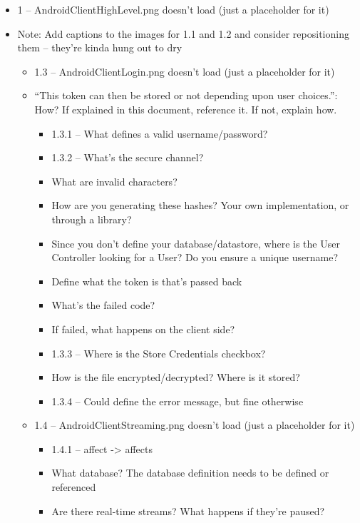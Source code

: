 \documentclass{article}
\begin{document}
\begin{itemize}
    \item 1 -- AndroidClientHighLevel.png doesn't load (just a placeholder for it)
    \item Note:  Add captions to the images for 1.1 and 1.2 and consider repositioning them -- they're kinda hung out to dry 
    \begin{itemize}
        \item 1.3 -- AndroidClientLogin.png doesn't load (just a placeholder for it)
        \item ``This token can then be stored or not depending upon user choices.'':  How?  If explained in this document, reference it.  If not, explain how.
        \begin{itemize}
            \item 1.3.1 -- What defines a valid username/password?
            \item 1.3.2 -- What's the secure channel?
            \item What are invalid characters?
            \item How are you generating these hashes?  Your own implementation, or through a library?
            \item Since you don't define your database/datastore, where is the User Controller looking for a User?  Do you ensure a unique username?  
            \item Define what the token is that's passed back 
            \item What's the failed code?
            \item If failed, what happens on the client side?
            \item 1.3.3 -- Where is the Store Credentials checkbox?
            \item How is the file encrypted/decrypted?  Where is it stored?
            \item 1.3.4 -- Could define the error message, but fine otherwise
        \end{itemize}
        \item 1.4 -- AndroidClientStreaming.png doesn't load (just a placeholder for it)
        \begin{itemize}
            \item 1.4.1 -- affect -> affects
            \item What database?  The database definition needs to be defined or referenced
            \item Are there real-time streams?  What happens if they're paused?

\end{itemize}
\end{itemize}
\end{itemize}
\end{document}
